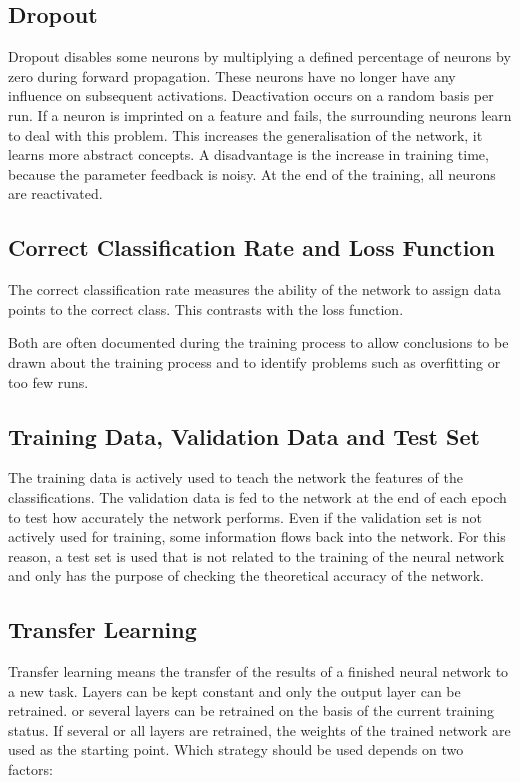 \subsection{Dropout}

Dropout disables some neurons by multiplying a defined percentage of neurons by zero during forward propagation. These neurons have
no longer have any influence on subsequent activations. Deactivation occurs on a random basis per run. If a neuron is imprinted on a feature and fails, the surrounding neurons learn to deal with this problem. This increases the generalisation of the network, it learns more abstract concepts. A disadvantage is the increase in training time, because the parameter feedback is noisy. At the end of the training, all neurons are reactivated. \cite{Becker:2018b}

\subsection{Correct Classification Rate and Loss Function}

The correct classification rate measures the ability of the network to assign data points to the correct class. This contrasts with the loss function. \cite{Chollet:2018}

Both are often documented during the training process to allow conclusions to be drawn about the training process and to identify problems such as overfitting or too few runs.


\subsection{Training Data, Validation Data and Test Set}

The training data is actively used to teach the network the features of the classifications. 	The validation data is fed to the network at the end of each epoch to test how accurately the network performs. Even if the validation set is not actively used for training, some information flows back into the network.	For this reason, a test set is used that is not related to the training of the neural network and only has the purpose of checking the theoretical accuracy of the network. \cite{Becker:2018}

\subsection{Transfer Learning}

Transfer learning means the transfer of the results of a finished neural network to a new task. 	Layers can be kept constant and only the output layer can be retrained.
or several layers can be retrained on the basis of the current training status. If several or all layers are retrained, the weights of the trained network are used as the starting point. Which strategy should be used depends on two factors:

